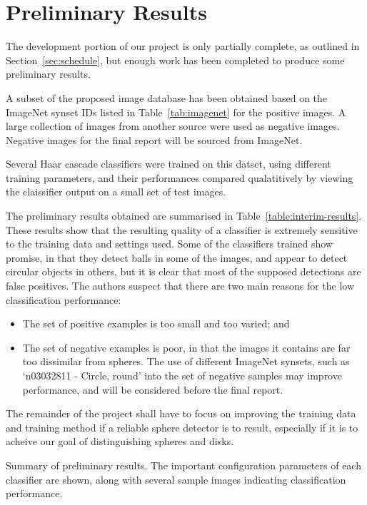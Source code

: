 \documentclass[11pt]{scrartcl}
\begin{document}
    \section{Preliminary Results} {
    \label{sec:results}

        The development portion of our project is only partially complete, as outlined in Section~\ref{sec:schedule}, but enough work has been completed to produce some preliminary results.

        A subset of the proposed image database has been obtained based on the ImageNet synset IDs listed in Table~\ref{tab:imagenet} for the positive images. A large collection of images from another source were used as negative images. Negative images for the final report will be sourced from ImageNet.

        Several Haar cascade classifiers were trained on this datset, using different training parameters, and their performances compared qualatitively by viewing the claissifier output on a small set of test images.

        The preliminary results obtained are summarised in Table~\ref{table:interim-results}.
        These results show that the resulting quality of a classifier is extremely sensitive to the training data and settings used.
        Some of the classifiers trained show promise, in that they detect balls in some of the images, and appear to detect circular objects in others, but it is clear that most of the supposed detections are false positives.
        The authors suspect that there are two main reasons for the low classification performance:

        \begin{itemize}
            \item The set of positive examples is too small and too varied; and
            \item The set of negative examples is poor, in that the images it contains are far too dissimilar from spheres.
                  The use of different ImageNet synsets, such as `n03032811 - Circle, round' into the set of negative samples may improve performance, and will be considered before the final report.
        \end{itemize}

        The remainder of the project shall have to focus on improving the training data and training method if a reliable sphere detector is to result, especially if it is to acheive our goal of distinguishing spheres and disks.

        \begin{table}[H]
            \caption{Summary of preliminary results. The important configuration parameters of each classifier are shown, along with several sample images indicating classification performance.}
            \centering
            \makebox[\textwidth][c]{\resizebox{0.5\paperwidth}{!}{}}
        \end{table}

    }
\end{document}
